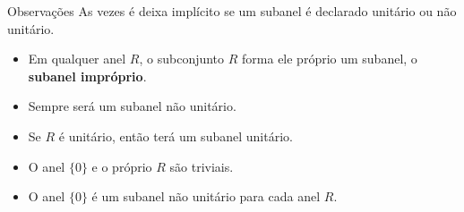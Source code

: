       \begin{mymdframed}{Observações}
         As vezes é deixa implícito se um subanel é declarado unitário ou não unitário.
         \begin{itemize}
            \item Em qualquer anel $R$, o subconjunto $R$ forma ele próprio um subanel, o \textbf{subanel impróprio}.
            \item Sempre será um subanel não unitário.
            \item Se $R$ é unitário, então terá um subanel unitário.
            \item O anel $\{0\}$ e o próprio $R$ são triviais. 
            \item O anel $\{0\}$ é um subanel não unitário para cada anel $R$.
         \end{itemize}
      \end{mymdframed}

